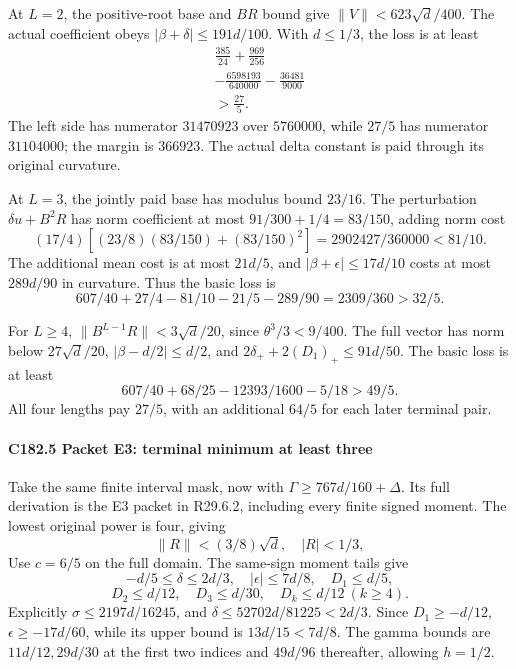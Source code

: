 At \(L=2\), the positive-root base and \(BR\) bound give \(\|V\|<623\sqrt d/400\). The actual coefficient obeys \(|\beta+\delta|\le191d/100\). With \(d\le1/3\), the loss is at least
\[
\begin{gathered}
\frac{385}{24}+\frac{969}{256}\\
-\frac{6598193}{640000}-\frac{36481}{9000}\\
>\frac{27}{5}.
\end{gathered}\tag{C182.30}
\]
The left side has numerator \(31470923\) over \(5760000\), while \(27/5\) has numerator \(31104000\); the margin is \(366923\). The actual delta constant is paid through its original curvature.

At \(L=3\), the jointly paid base has modulus bound \(23/16\). The perturbation \(\delta u+B^2R\) has norm coefficient at most \(91/300+1/4=83/150\), adding norm cost
\[
 (17/4)[(23/8)(83/150)+(83/150)^2]
 =2902427/360000<81/10.
\]
The additional mean cost is at most \(21d/5\), and \(|\beta+\epsilon|\le17d/10\) costs at most \(289d/90\) in curvature. Thus the basic loss is
\[
 607/40+27/4-81/10-21/5-289/90=2309/360>32/5.       \tag{C182.31}
\]

For \(L\ge4\), \(\|B^{L-1}R\|<3\sqrt d/20\), since \(\theta^3/3<9/400\). The full vector has norm below \(27\sqrt d/20\), \(|\beta-d/2|\le d/2\), and \(2\delta_++2(D_1)_+\le91d/50\). The basic loss is at least
\[
 607/40+68/25-12393/1600-5/18>49/5.                 \tag{C182.32}
\]
All four lengths pay \(27/5\), with an additional \(64/5\) for each later terminal pair.

\paragraph{C182.5 Packet E3: terminal minimum at least three}

Take the same finite interval mask, now with \(\Gamma\ge767d/160+\Delta\). Its full derivation is the E3 packet in R29.6.2, including every finite signed moment. The lowest original power is four, giving
\[
 \|R\|<(3/8)\sqrt d,\quad |R|<1/3,
\]
Use \(c=6/5\) on the full domain. The same-sign moment tails give
\[
 -d/5\le\delta\le2d/3,\quad |\epsilon|\le7d/8,\quad D_1\le d/5,
\]
\[
 D_2\le d/12,\quad D_3\le d/30,\quad D_k\le d/12\ (k\ge4). \tag{C182.33}
\]
Explicitly \(\sigma\le2197d/16245\), and \(\delta\le52702d/81225<2d/3\). Since \(D_1\ge-d/12\), \(\epsilon\ge-17d/60\), while its upper bound is \(13d/15<7d/8\). The gamma bounds are \(11d/12,\allowbreak \allowbreak  29d/30\) at the first two indices and \(49d/96\) thereafter, allowing \(h=1/2\).

